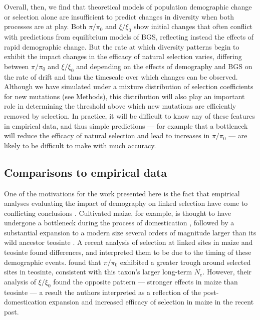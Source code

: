 \documentclass[9pt,twocolumn,twoside]{rilabRxiv}
\begin{document}
Overall, then, we find that theoretical models of population demographic change or selection alone are insufficient to predict changes in diversity when both processes are at play. 
Both $\pi/\pi_0$ and $\xi/\xi_0$ show initial changes that often conflict with predictions from equilibrium models of BGS, reflecting instead the effects of rapid demographic change.
But the rate at which diversity patterns begin to exhibit the impact changes in the efficacy of natural selection varies, differing between $\pi/\pi_0$ and $\xi/\xi_0$ and depending on the effects of demography and BGS on the rate of drift and thus the timescale over which changes can be observed.
Although we have simulated under a mixture distribution of selection coefficients for new mutations (see Methods), this distribution will also play an important role in determining the threshold above which new mutations are efficiently removed by selection.
In practice, it will be difficult to know any of these features in empirical data, and thus simple predictions --- for example that a bottleneck will reduce the efficacy of natural selection and lead to increases in $\pi/\pi_0$ --- are likely to be difficult to make with much accuracy.

\subsection{Comparisons to empirical data}

One of the motivations for the work presented here is the fact that empirical analyses evaluating the impact of demography on linked selection have come to conflicting conclusions \citep{torres2018human, beissinger2016recent}.
Cultivated maize, for example, is thought to have undergone a bottleneck during the process of domestication \citep{eyre1998investigation,tenaillon2004selection,wright2005effects}, followed by a substantial expansion to a modern size several orders of magnitude larger than its wild ancestor teosinte \citep{beissinger2016recent, bellon2018evolutionary}.
A recent analysis of selection at linked sites in  maize and teosinte found differences, and interpreted them to be due to the timing of these demographic events.
\citet{beissinger2016recent} found that $\pi/\pi_0$ exhibited a greater trough around selected sites in teosinte, consistent with this taxon's larger long-term $N_e$.
However, their analysis of $\xi/\xi_0$ found the opposite pattern --- stronger effects in maize than teosinte --- a result the authors interpreted as a reflection of the post-domestication expansion and increased efficacy of selection in maize in the recent past.
\end{document}
